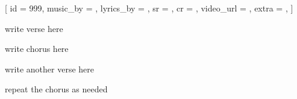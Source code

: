 [
    id          = {999},
    music_by    = {},
    lyrics_by   = {},
    sr          = {},
    cr          = {},
    video_url   = {},
    extra       = {},
]

\beginverse
write verse here
\endverse

\beginchorus
write chorus here
\endchorus

\beginverse
write another verse here
\endverse

\beginchorus
repeat the chorus as needed
\endchorus

\endsong
